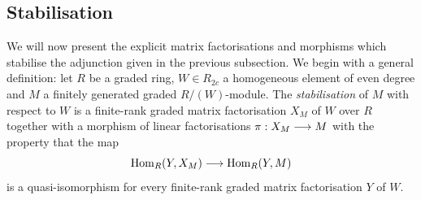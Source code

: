 \documentclass{compositio}
\theoremstyle{definition}
\numberwithin{equation}{section}
\def\Hom{\operatorname{Hom}}
\begin{document}

\subsection{Stabilisation}\label{section:stabilisation}

We will now present the explicit matrix factorisations and morphisms which stabilise the adjunction given in the previous subsection. We begin with a general definition: let $R$ be a graded ring, $W \in R_{2c}$ a homogeneous element of even degree and $M$ a finitely generated graded $R/(W)$-module. The \emph{stabilisation} of $M$ with respect to $W$ is a finite-rank graded matrix factorisation $X_M$ of $W$ over $R$ together with a morphism of linear factorisations $\pi: X_M \longrightarrow M$ with the property that the map
\[
\Hom_R(Y, X_M) \lto \Hom_R(Y, M)
\]
is a quasi-isomorphism for every finite-rank graded matrix factorisation $Y$ of $W$.

\end{document}
